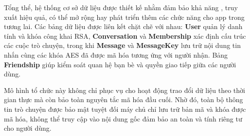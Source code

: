 \indent Tổng thể, hệ thống cơ sở dữ liệu được thiết kế nhằm đảm bảo khả năng , truy xuất hiệu quả, có thể mở rộng hay phát triển thêm các chức năng cho app trong tương lai.  
Các bảng dữ liệu được liên kết chặt chẽ với nhau: \textbf{User} quản lý danh tính và khóa công khai RSA, \textbf{Conversation} và \textbf{Membership} xác định cấu trúc các cuộc trò chuyện, trong khi \textbf{Message} và \textbf{MessageKey} lưu trữ nội dung tin nhắn cùng các khóa AES đã được mã hóa tương ứng với người nhận.  
Bảng \textbf{Friendship} giúp kiểm soát quan hệ bạn bè và quyền giao tiếp giữa các người dùng.  

\indent Mô hình tổ chức này không chỉ phục vụ cho hoạt động trao đổi dữ liệu theo thời gian thực mà còn bảo toàn nguyên tắc mã hóa đầu cuối.  
Nhờ đó, toàn bộ thông tin trò chuyện được bảo mật tuyệt đối máy chủ chỉ lưu trữ bản mã và khóa được mã hóa, không thể truy cập vào nội dung gốc đảm bảo an toàn và tính riêng tư cho người dùng.



